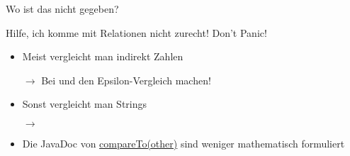 \documentclass[usepdftitle=false,hyperref={pdfpagelabels=false}]{beamer}
\begin{document}
\begin{frame}{Wo ist das nicht gegeben?}
    \begin{itemize}
    \end{itemize}
\end{frame}

\begin{frame}{Hilfe, ich komme mit Relationen nicht zurecht!}
    Don't Panic!

    \begin{itemize}
        \item Meist vergleicht man indirekt Zahlen
        \item[$\rightarrow$] Bei  und  den Epsilon-Vergleich machen!
        \item Sonst vergleicht man Strings
        \item[$\rightarrow$] 
        \item Die JavaDoc von \href{http://docs.oracle.com/javase/7/docs/api/java/lang/Comparable.html\#compareTo\%28T\%29}{compareTo(other)}
              sind weniger mathematisch formuliert
    \end{itemize}
\end{frame}
\end{document}
